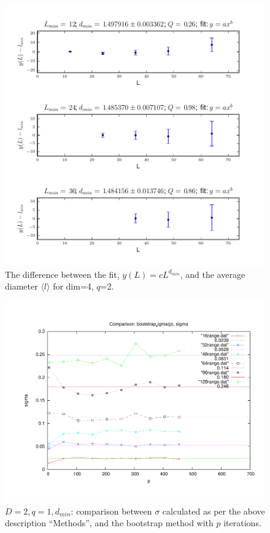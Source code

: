 \documentclass[pre,preprint]{revtex4}
\newcommand{\lb}{{\langle}}
\newcommand{\rb}{{\rangle}}
\begin{document}

\begin{figure}[htp]
\centering
\includegraphics[width=.9\textwidth]{figures/d_min_D4q2_46_fig}
\caption{The difference between the fit, $y(L)=cL^{d_{min}}$, and the average diameter $\lb l \rb$ for dim=4, $q$=2.}\label{fig:b}
\end{figure}

\begin{figure}[htp]
\centering
\includegraphics[width=.9\textwidth]{figures/boot}
\caption{$D=2, q=1, d_{min}$: comparison between $\sigma$ calculated as per the above description ``Methods'', and the bootstrap method with $p$ iterations.}\label{fig:b}
\end{figure}
\end{document}
